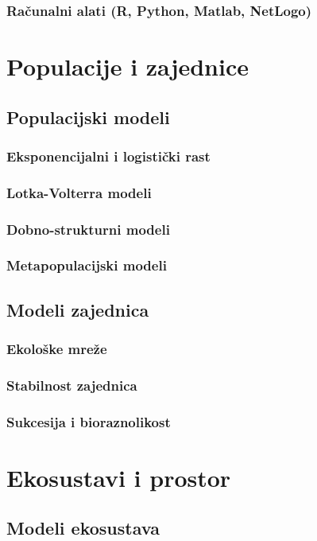 \documentclass[12pt,a4paper]{book}
\begin{document}
	\section{Računalni alati (R, Python, Matlab, NetLogo)}
	
	\part{Populacije i zajednice}
	\chapter{Populacijski modeli}
	\section{Eksponencijalni i logistički rast}
	\section{Lotka-Volterra modeli}
	\section{Dobno-strukturni modeli}
	\section{Metapopulacijski modeli}
	
	\chapter{Modeli zajednica}
	\section{Ekološke mreže}
	\section{Stabilnost zajednica}
	\section{Sukcesija i bioraznolikost}
	
	\part{Ekosustavi i prostor}
	\chapter{Modeli ekosustava}
\end{document}
